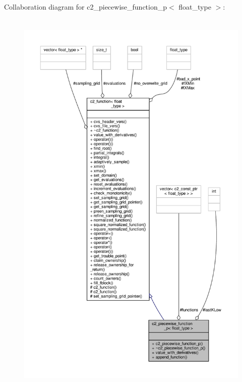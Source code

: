 Collaboration diagram for c2\+\_\+piecewise\+\_\+function\+\_\+p$<$ float\+\_\+type $>$\+:
\nopagebreak
\begin{figure}[H]
\begin{center}
\leavevmode
\includegraphics[height=550pt]{classc2__piecewise__function__p__coll__graph}
\end{center}
\end{figure}
